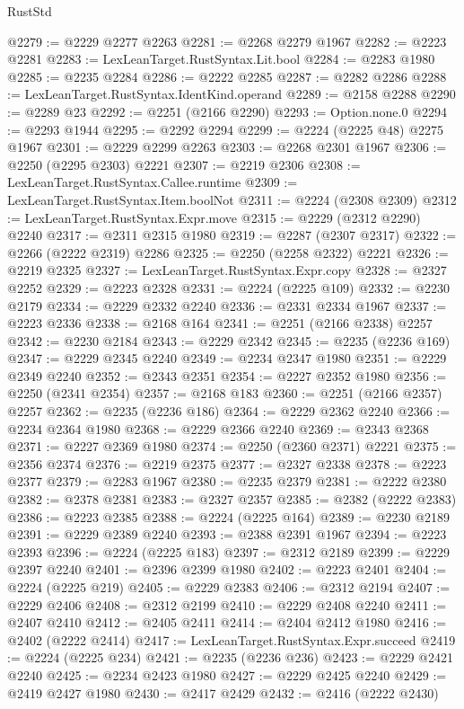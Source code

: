 \begin{lexlean}{RustStd}
\begin{coremodule}
{\begin{coremodule}
{{{{{{{{{{{{{{{{{{{{{{{{{{{{{{{{{{{{{{{{{{{{{{{{{{{{{@2279 := @2229 @2277 @2263
@2281 := @2268 @2279 @1967
@2282 := @2223 @2281
@2283 := LexLeanTarget.RustSyntax.Lit.bool
@2284 := @2283 @1980
@2285 := @2235 @2284
@2286 := @2222 @2285
@2287 := @2282 @2286
@2288 := LexLeanTarget.RustSyntax.IdentKind.operand
@2289 := @2158 @2288
@2290 := @2289 @23
@2292 := @2251 (@2166 @2290)
@2293 := Option.none.{0}
@2294 := @2293 @1944
@2295 := @2292 @2294
@2299 := @2224 (@2225 @48) @2275 @1967
@2301 := @2229 @2299 @2263
@2303 := @2268 @2301 @1967
@2306 := @2250 (@2295 @2303) @2221
@2307 := @2219 @2306
@2308 := LexLeanTarget.RustSyntax.Callee.runtime
@2309 := LexLeanTarget.RustSyntax.Item.boolNot
@2311 := @2224 (@2308 @2309)
@2312 := LexLeanTarget.RustSyntax.Expr.move
@2315 := @2229 (@2312 @2290) @2240
@2317 := @2311 @2315 @1980
@2319 := @2287 (@2307 @2317)
@2322 := @2266 (@2222 @2319) @2286
@2325 := @2250 (@2258 @2322) @2221
@2326 := @2219 @2325
@2327 := LexLeanTarget.RustSyntax.Expr.copy
@2328 := @2327 @2252
@2329 := @2223 @2328
@2331 := @2224 (@2225 @109)
@2332 := @2230 @2179
@2334 := @2229 @2332 @2240
@2336 := @2331 @2334 @1967
@2337 := @2223 @2336
@2338 := @2168 @164
@2341 := @2251 (@2166 @2338) @2257
@2342 := @2230 @2184
@2343 := @2229 @2342
@2345 := @2235 (@2236 @169)
@2347 := @2229 @2345 @2240
@2349 := @2234 @2347 @1980
@2351 := @2229 @2349 @2240
@2352 := @2343 @2351
@2354 := @2227 @2352 @1980
@2356 := @2250 (@2341 @2354)
@2357 := @2168 @183
@2360 := @2251 (@2166 @2357) @2257
@2362 := @2235 (@2236 @186)
@2364 := @2229 @2362 @2240
@2366 := @2234 @2364 @1980
@2368 := @2229 @2366 @2240
@2369 := @2343 @2368
@2371 := @2227 @2369 @1980
@2374 := @2250 (@2360 @2371) @2221
@2375 := @2356 @2374
@2376 := @2219 @2375
@2377 := @2327 @2338
@2378 := @2223 @2377
@2379 := @2283 @1967
@2380 := @2235 @2379
@2381 := @2222 @2380
@2382 := @2378 @2381
@2383 := @2327 @2357
@2385 := @2382 (@2222 @2383)
@2386 := @2223 @2385
@2388 := @2224 (@2225 @164)
@2389 := @2230 @2189
@2391 := @2229 @2389 @2240
@2393 := @2388 @2391 @1967
@2394 := @2223 @2393
@2396 := @2224 (@2225 @183)
@2397 := @2312 @2189
@2399 := @2229 @2397 @2240
@2401 := @2396 @2399 @1980
@2402 := @2223 @2401
@2404 := @2224 (@2225 @219)
@2405 := @2229 @2383
@2406 := @2312 @2194
@2407 := @2229 @2406
@2408 := @2312 @2199
@2410 := @2229 @2408 @2240
@2411 := @2407 @2410
@2412 := @2405 @2411
@2414 := @2404 @2412 @1980
@2416 := @2402 (@2222 @2414)
@2417 := LexLeanTarget.RustSyntax.Expr.succeed
@2419 := @2224 (@2225 @234)
@2421 := @2235 (@2236 @236)
@2423 := @2229 @2421 @2240
@2425 := @2234 @2423 @1980
@2427 := @2229 @2425 @2240
@2429 := @2419 @2427 @1980
@2430 := @2417 @2429
@2432 := @2416 (@2222 @2430)
}}}}}}}}}}}}}}}}}}}}}}}}}}}}}}}}}}}}}}}}}}}}}}}}}}}}}
\end{coremodule}}
\end{coremodule}
\end{lexlean}
